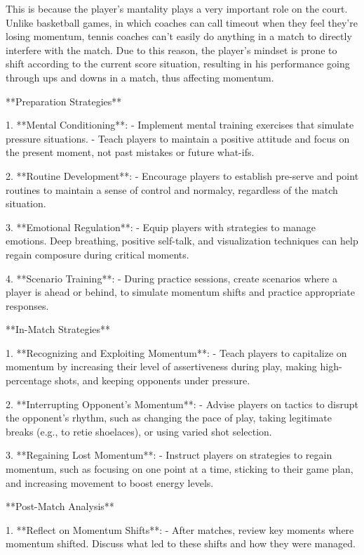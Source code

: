 This is because the player's mantality plays a very important role on the court. Unlike basketball games, in which coaches can call timeout when they feel they're losing momentum, tennis coaches can't easily do anything in a match to directly interfere with the match. Due to this reason, the player's mindset is prone to shift according to the current score situation, resulting in his performance going through ups and downs in a match, thus affecting momentum.



**Preparation Strategies**

1. **Mental Conditioning**:
   - Implement mental training exercises that simulate pressure situations.
   - Teach players to maintain a positive attitude and focus on the present moment, not past mistakes or future what-ifs.

2. **Routine Development**:
   - Encourage players to establish pre-serve and point routines to maintain a sense of control and normalcy, regardless of the match situation.

3. **Emotional Regulation**:
   - Equip players with strategies to manage emotions. Deep breathing, positive self-talk, and visualization techniques can help regain composure during critical moments.

4. **Scenario Training**:
   - During practice sessions, create scenarios where a player is ahead or behind, to simulate momentum shifts and practice appropriate responses.

**In-Match Strategies**

1. **Recognizing and Exploiting Momentum**:
   - Teach players to capitalize on momentum by increasing their level of assertiveness during play, making high-percentage shots, and keeping opponents under pressure.

2. **Interrupting Opponent's Momentum**:
   - Advise players on tactics to disrupt the opponent's rhythm, such as changing the pace of play, taking legitimate breaks (e.g., to retie shoelaces), or using varied shot selection.

3. **Regaining Lost Momentum**:
   - Instruct players on strategies to regain momentum, such as focusing on one point at a time, sticking to their game plan, and increasing movement to boost energy levels.

**Post-Match Analysis**

1. **Reflect on Momentum Shifts**:
   - After matches, review key moments where momentum shifted. Discuss what led to these shifts and how they were managed.

